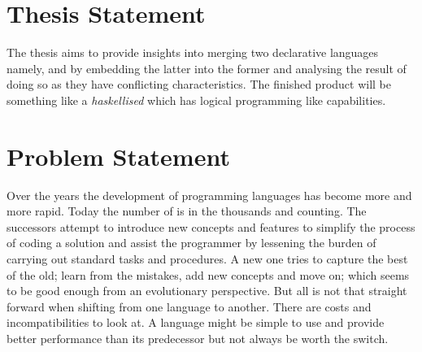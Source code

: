 \documentclass[thesis-solanki.tex]{subfiles}
\begin{document}
\section{Thesis Statement}

The thesis aims to provide insights into merging two declarative languages namely,  and  by embedding 
the latter into the former and analysing the result of doing so as they have conflicting characteristics. The finished product will be 
something like a \textit{haskellised}  which has logical programming like capabilities.       


\section{Problem Statement}

Over the years the development of programming languages has become more and more rapid. Today the number of is in the thousands and counting. The 
successors attempt to introduce new concepts and features to simplify the process of coding a solution and assist the programmer by lessening the 
burden of carrying out standard tasks and procedures. A new one tries to capture the best of the old; learn from the mistakes, add new concepts and 
move on; which seems to be good enough from an evolutionary perspective. But all is not that straight forward when shifting from one language 
to another. There are costs and incompatibilities to look at. A language might be simple to use and provide better performance than its 
predecessor but not always be worth the switch.
\end{document}
